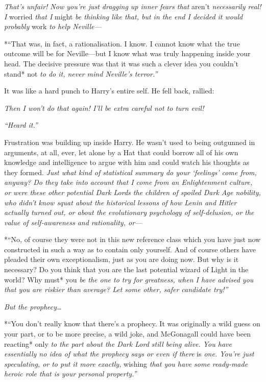 \emph{That's unfair! Now you're just dragging up inner fears that}
aren't \emph{necessarily real! I} worried \emph{that I} might \emph{be
thinking like that, but in the end I decided it would probably} work
\emph{to help Neville---}

*``That was, in fact, a rationalisation. I know. I cannot know what the
true outcome will be for Neville---but I know what was truly happening
inside your head. The decisive pressure was that it was such a clever
idea you couldn't stand* not \emph{to do it, never mind Neville's
terror.''}

It was like a hard punch to Harry's entire self. He fell back, rallied:

\emph{Then I won't do that again! I'll be extra careful not to turn
evil!}

\emph{``Heard it.''}

Frustration was building up inside Harry. He wasn't used to being
outgunned in arguments, at all, ever, let alone by a Hat that could
borrow all of his own knowledge and intelligence to argue with him and
could watch his thoughts as they formed. \emph{Just what kind of
statistical summary do your `feelings' come from, anyway? Do they take
into account that I come from an Enlightenment culture, or were these
other potential Dark Lords the children of spoiled Dark Age nobility,
who didn't know squat about the historical lessons of how Lenin and
Hitler actually turned out, or about the evolutionary psychology of
self-delusion, or the value of self-awareness and rationality, or---}

*``No, of course they were not in this new reference class which you
have just now constructed in such a way as to contain only yourself. And
of course others have pleaded their own exceptionalism, just as you are
doing now. But why is it necessary? Do you think that you are the last
potential wizard of Light in the world? Why must* you \emph{be the one
to try for greatness, when I have advised you that you are riskier than
average? Let some other, safer candidate try!''}

\emph{But the prophecy\ldots{}}

*``You don't really know that there's a prophecy. It was originally a
wild guess on your part, or to be more precise, a wild joke, and
McGonagall could have been reacting* only \emph{to the part about the
Dark Lord still being alive. You have essentially no idea of what the
prophecy says or even if there} is \emph{one. You're just speculating,
or to put it more exactly,} wishing \emph{that you have some ready-made
heroic role that is your personal property.''}

